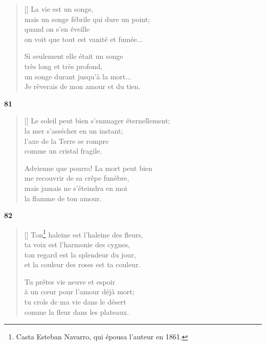 \documentclass[a4paper,12pt]{book}
\begin{document}
\begin{verse}[\versewidth]
  La vie est un songe, \\
  mais un songe fébrile qui dure un point; \\
  quand on s'en éveille \\
  on voit que tout est vanité et fumée...

  Si seulement elle était un songe \\
  très long et très profond, \\
  un songe durant jusqu'à la mort... \\
  Je rêverais de mon amour et du tien.
\end{verse}

\bigskip

\begin{center}
  \textbf{81}
\end{center}

\settowidth{\versewidth}{Le soleil peut bien s'ennuager éternellement;}


\begin{verse}[\versewidth]
  Le soleil peut bien s'ennuager éternellement; \\
  la mer s'assécher en un instant; \\
  l'axe de la Terre se rompre \\
  comme un cristal fragile.

  Advienne que pourra! La mort peut bien \\
  me recouvrir de sa crêpe funèbre, \\
  mais jamais ne s'éteindra en moi \\
  la flamme de ton amour.
\end{verse}

\bigskip

\begin{center}
  \textbf{82}
\end{center}

\settowidth{\versewidth}{et la couleur des roses est ta couleur.}


\begin{verse}[\versewidth]
  Ton\footnote{Casta Esteban Navarro, qui épousa
  l'auteur en 1861.} haleine est l'haleine des fleurs, \\
  ta voix est l'harmonie des cygnes, \\
  ton regard est la splendeur du jour, \\
  et la couleur des roses est ta couleur.

  Tu prêtes vie neuve et espoir \\
  à un cœur pour l'amour déjà mort; \\
  tu croîs de ma vie dans le désert \\
  comme la fleur dans les plateaux.
\end{verse}
\end{document}
